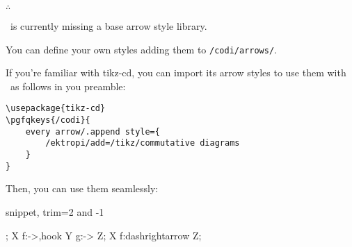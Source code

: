 
\hfill$\therefore$\hfill\null


\CoDi\ is currently missing a base arrow style library.

You can define your own styles adding them to \lstinline|/codi/arrows/|.

If you're familiar with {\ttfamily\small tikz-cd}, you can import its arrow styles to use them with \CoDi\ as follows in you preamble:
\begin{lstlisting}
\usepackage{tikz-cd}
\pgfqkeys{/codi}{
    every arrow/.append style={
        /ektropi/add=/tikz/commutative diagrams
    }
}
\end{lstlisting}

Then, you can use them seamlessly:

\begin{tcblisting}{snippet, trim={2 and -1}}
\begin{codi}
;
\mor X f:->,hook Y g:-> Z;
\mor X f:dashrightarrow Z;
\end{codi}
\end{tcblisting}
